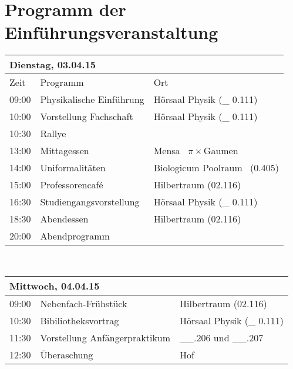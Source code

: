\section{Programm der Einführungsveranstaltung}
\begin{centering}
\renewcommand{\arraystretch}{1.5}
\begin{tabular}{|p{1.5cm}||p{8cm}  |p{5cm}|}
	\hline
	\multicolumn{3}{|l|}{\textbf{Dienstag, 03.04.15}}\\
	\hline
	Zeit  & Programm					& Ort\\
	\hline
	09:00 & Physikalische Einführung	& Hörsaal Physik (\_ 0.111) \\
	\hline
	10:00 & Vorstellung Fachschaft		& Hörsaal Physik (\_ 0.111) \\
	\hline
	10:30 & Rallye						& \\
	\hline
	13:00 & Mittagessen					& Mensa	\ $\pi \times$Gaumen \\
	\hline
	14:00 & Uniformalitäten 			& Biologicum Poolraum \ (0.405) \\
	\hline
	15:00 & Professorencafé 			& Hilbertraum (02.116) \\
	\hline
	16:30 & Studiengangsvorstellung 	& Hörsaal Physik (\_ 0.111) \\
	\hline
	18:30 & Abendessen 					& Hilbertraum (02.116) \\
	\hline
	20:00 & Abendprogramm & \\
  	\hline
\end{tabular}
\end{centering}\\
\begin{centering}
\renewcommand{\arraystretch}{1.5}
\begin{tabular}{|p{1.5cm}||p{8cm}|p{5cm}|}
  \hline
  \multicolumn{3}{|l|}{\textbf{Mittwoch, 04.04.15}} \\
  \hline
  09:00 & Nebenfach-Frühstück 			& Hilbertraum (02.116) \\
  \hline
  10:30 & Bibiliotheksvortrag 			& Hörsaal Physik (\_ 0.111) \\
  \hline
  11:30 & Vorstellung Anfängerpraktikum & \_\_.206 und \_\_.207 \\
  \hline
  12:30 & Überaschung 					& Hof \\
  \hline
\end{tabular}
\end{centering}